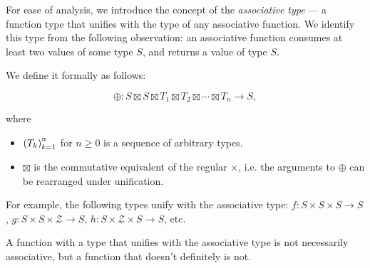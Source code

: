 For ease of analysis, we introduce the concept of the \emph{associative type}
--- a function type that unifies with the type of any associative function. We
identify this type from the following observation: an associative function
consumes at least two values of some type $S$, and returns a value of type $S$.

We define it formally as follows:

\[\oplus:S \boxtimes S \boxtimes T_1 \boxtimes T_2 \boxtimes \cdots \boxtimes
T_n \rightarrow S, \]

where

\begin{itemize}

\item $\left({T_k}\right)_{k=1}^n$ for $n\geq 0$ is a sequence of arbitrary types.

\item $\boxtimes$ is the commutative equivalent of the regular $\times$, i.e.
the arguments to $\oplus$ can be rearranged under unification.

\end{itemize}

For example, the following types unify with the associative type: $f:S \times S
\times S \rightarrow S$, $g:S \times S \times \mathcal{Z} \rightarrow S$, $h:S
\times \mathcal{Z} \times S \rightarrow S$, etc.

A function with a type that unifies with the associative type is not
necessarily associative, but a function that doesn't definitely is not.
